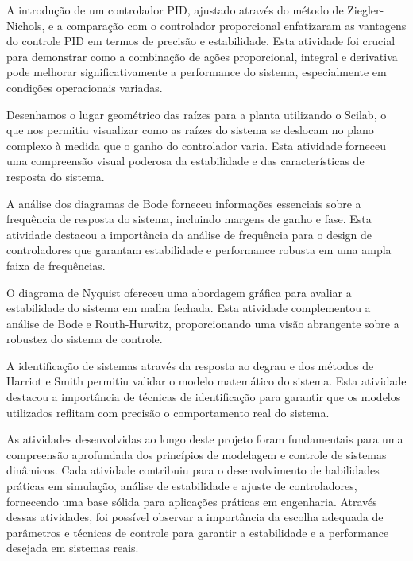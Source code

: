 A introdução de um controlador PID, ajustado através do método de Ziegler-Nichols, e a comparação com o controlador proporcional enfatizaram as vantagens do controle PID em termos de precisão e estabilidade. Esta atividade foi crucial para demonstrar como a combinação de ações proporcional, integral e derivativa pode melhorar significativamente a performance do sistema, especialmente em condições operacionais variadas.

Desenhamos o lugar geométrico das raízes para a planta utilizando o Scilab, o que nos permitiu visualizar como as raízes do sistema se deslocam no plano complexo à medida que o ganho do controlador varia. Esta atividade forneceu uma compreensão visual poderosa da estabilidade e das características de resposta do sistema.

A análise dos diagramas de Bode forneceu informações essenciais sobre a frequência de resposta do sistema, incluindo margens de ganho e fase. Esta atividade destacou a importância da análise de frequência para o design de controladores que garantam estabilidade e performance robusta em uma ampla faixa de frequências.

O diagrama de Nyquist ofereceu uma abordagem gráfica para avaliar a estabilidade do sistema em malha fechada. Esta atividade complementou a análise de Bode e Routh-Hurwitz, proporcionando uma visão abrangente sobre a robustez do sistema de controle.

A identificação de sistemas através da resposta ao degrau e dos métodos de Harriot e Smith permitiu validar o modelo matemático do sistema. Esta atividade destacou a importância de técnicas de identificação para garantir que os modelos utilizados reflitam com precisão o comportamento real do sistema.

As atividades desenvolvidas ao longo deste projeto foram fundamentais para uma compreensão aprofundada dos princípios de modelagem e controle de sistemas dinâmicos. Cada atividade contribuiu para o desenvolvimento de habilidades práticas em simulação, análise de estabilidade e ajuste de controladores, fornecendo uma base sólida para aplicações práticas em engenharia. Através dessas atividades, foi possível observar a importância da escolha adequada de parâmetros e técnicas de controle para garantir a estabilidade e a performance desejada em sistemas reais.
